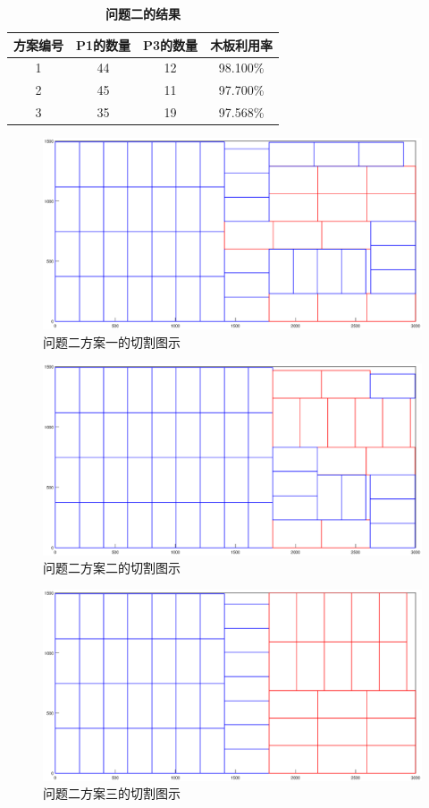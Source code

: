 \documentclass[hyperref,UTF8]{article}
\begin{document}
{\begin{table}[htbp]
  \centering
  \caption{\textbf{问题二的结果}}
    \begin{tabular}{|c|c|c|c|}
    \hline
    方案编号& P1的数量 & P3的数量 & 木板利用率\\
    \hline
    1 & 44 & 12 & 98.100\% \\
    \hline
    2 & 45 & 11 & 97.700\% \\
    \hline
    3 & 35 & 19 & 97.568\% \\
    \hline
    \end{tabular}%
  \label{tab:addlabela}%
\end{table}%
\begin{figure}[htbp]
  \centering
  \includegraphics[width=\textwidth]{picture/P_2_44_12}
  \caption{问题二方案一的切割图示}\label{probelem11}
\end{figure}
\begin{figure}[htbp]
  \centering
  \includegraphics[width=\textwidth]{picture/P_2_45_11}
  \caption{问题二方案二的切割图示}\label{probelem12}
\end{figure}
\begin{figure}[htbp]
  \centering
  \includegraphics[width=\textwidth]{picture/P_2_35_19}
  \caption{问题二方案三的切割图示}\label{probelem13}
\end{figure}
}
\end{document}

